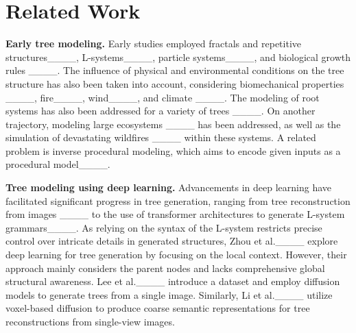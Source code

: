 \section{Related Work}
\noindent\textbf{Early tree modeling.}
Early studies employed fractals and repetitive structures____, L-systems____, particle systems____, and biological growth rules ____. 
The influence of physical and environmental conditions on the tree structure has also been taken into account, considering biomechanical properties ____, fire____, wind____, and climate ____. The modeling of root systems has also been addressed for a variety of trees ____. On another trajectory, modeling large ecosystems ____ has been addressed, as well as the simulation of devastating wildfires ____ within these systems.
A related problem is inverse procedural modeling, which aims to encode given inputs as a procedural model____.


\noindent\textbf{Tree modeling using deep learning.}
Advancements in deep learning have facilitated significant progress in tree generation, ranging from tree reconstruction from images ____ to the use of transformer architectures to generate L-system grammars____. As relying on the syntax of the L-system restricts precise control over intricate details in generated structures, Zhou et al.____ explore deep learning for tree generation by focusing on the local context. However, their approach mainly considers the parent nodes and lacks comprehensive global structural awareness. Lee et al.____ introduce a dataset and employ diffusion models to generate trees from a single image. Similarly, Li et al.____ utilize voxel-based diffusion to produce coarse semantic representations for tree reconstructions from single-view images. 



